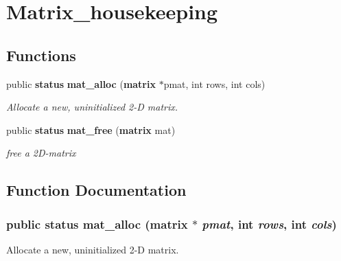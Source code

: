 \section{Matrix\_\-housekeeping}
\label{group__matrix__housekeeping}
\subsection*{Functions}
\begin{CompactItemize}
\item 
public {\bf status} {\bf mat\_\-alloc} ({\bf matrix} $\ast$pmat, int rows, int cols)
\begin{CompactList}\small\item\em Allocate a new, uninitialized 2-D matrix.\item\end{CompactList}\item 
public {\bf status} {\bf mat\_\-free} ({\bf matrix} mat)
\begin{CompactList}\small\item\em free a 2D-matrix\item\end{CompactList}\end{CompactItemize}


\subsection{Function Documentation}
\subsubsection{\setlength{\rightskip}{0pt plus 5cm}public {\bf status} mat\_\-alloc ({\bf matrix} $\ast$ {\em pmat}, int {\em rows}, int {\em cols})}\label{group__matrix__housekeeping_a0}


Allocate a new, uninitialized 2-D matrix.

